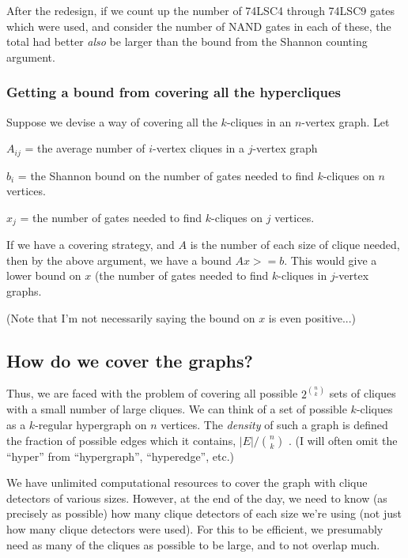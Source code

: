 \documentclass[12pt]{article}
\theoremstyle{definition}
\begin{document}
After the redesign, if 
we count up the number of 74LSC4 through 74LSC9 gates which were used,
and consider the number of NAND gates in each
of these, the total had better {\em also} be larger than the bound from
the Shannon counting argument.

\subsubsection{Getting a bound from covering all the hypercliques}

Suppose we devise a way of covering all the $k$-cliques in an $n$-vertex
graph. Let

$A_{ij}$ = the average number of $i$-vertex cliques in a $j$-vertex graph

$b_i$ = the Shannon bound on the number of
gates needed to find $k$-cliques on $n$ vertices.

$x_j$ = the number of gates needed to find $k$-cliques on $j$ vertices.

If we have a covering strategy, and $A$ is the number of each size of
clique needed, then by the above argument, we have a bound $Ax >= b$.
This would give a lower bound on $x$ (the number of gates needed to find
$k$-cliques in $j$-vertex graphs.

(Note that I'm not necessarily saying the bound on $x$ is even positive...)

\subsection{How do we cover the graphs?}

Thus, we are faced with the problem of covering all possible $2^{n \choose k}$
sets of cliques with a small number of large cliques.
We can think of a set of possible $k$-cliques as
a $k$-regular hypergraph on $n$ vertices. The {\em density}
of such a graph is defined the fraction of possible edges which it contains,
$|E| / {n \choose k}$ \cite{keevash2011hypergraph}.
(I will often omit the ``hyper'' from
``hypergraph'', ``hyperedge'', etc.)

We have unlimited computational resources to cover the
graph with clique detectors of various sizes. However,
at the end of the day, we need to know (as precisely as possible)
how many clique detectors of each
size we're using (not just how many clique detectors were used).
For this to be efficient, we presumably need as many of
the cliques as possible to be large, and to not overlap much.
\end{document}

